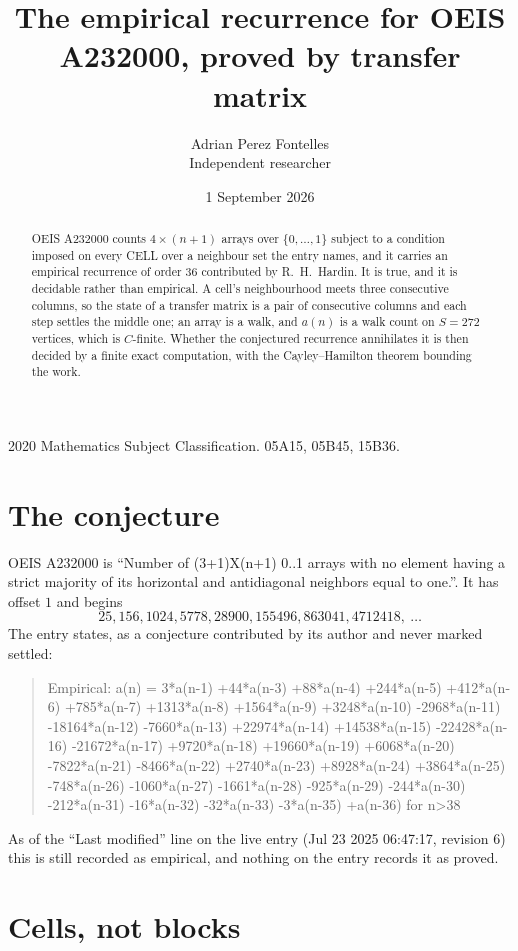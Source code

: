 \documentclass[11pt,a4paper]{article}
\title{The empirical recurrence for OEIS A232000, proved by transfer matrix}
\author{Adrian Perez Fontelles\\ \small Independent researcher}
\date{1 September 2026}
\theoremstyle{plain}
\theoremstyle{definition}
\begin{document}
\maketitle

\begin{abstract}
OEIS A232000 counts $4\times(n+1)$ arrays over $\{0,\dots,1\}$ subject to a condition imposed on
every CELL over a neighbour set the entry names, and it carries an empirical recurrence of
order $36$ contributed by R.~H.~Hardin. It is true, and it is decidable rather than
empirical. A cell's neighbourhood meets three consecutive columns, so the state of a transfer
matrix is a pair of consecutive columns and each step settles the middle one; an array is a
walk, and $a(n)$ is a walk count on $S=272$ vertices, which is $C$-finite. Whether the
conjectured recurrence annihilates it is then decided by a finite exact computation, with the
Cayley--Hamilton theorem bounding the work.
\end{abstract}

\noindent\small 2020 Mathematics Subject Classification. 05A15, 05B45, 15B36.\normalsize

\section{The conjecture}

OEIS A232000 is ``Number of (3+1)X(n+1) 0..1 arrays with no element having a strict majority of its horizontal and antidiagonal neighbors equal to one.''. It has offset $1$ and begins
\[
25, 156, 1024, 5778, 28900, 155496, 863041, 4712418,\ \dots
\]
The entry states, as a conjecture contributed by its author and never marked settled:
\begin{quote}
Empirical: a(n) = 3*a(n-1) +44*a(n-3) +88*a(n-4) +244*a(n-5) +412*a(n-6) +785*a(n-7) +1313*a(n-8) +1564*a(n-9) +3248*a(n-10) -2968*a(n-11) -18164*a(n-12) -7660*a(n-13) +22974*a(n-14) +14538*a(n-15) -22428*a(n-16) -21672*a(n-17) +9720*a(n-18) +19660*a(n-19) +6068*a(n-20) -7822*a(n-21) -8466*a(n-22) +2740*a(n-23) +8928*a(n-24) +3864*a(n-25) -748*a(n-26) -1060*a(n-27) -1661*a(n-28) -925*a(n-29) -244*a(n-30) -212*a(n-31) -16*a(n-32) -32*a(n-33) -3*a(n-35) +a(n-36) for n>38
\end{quote}
As of the ``Last modified'' line on the live entry (Jul 23 2025 06:47:17, revision 6) this is still
recorded as empirical, and nothing on the entry records it as proved.

\section{Cells, not blocks}
\end{document}
